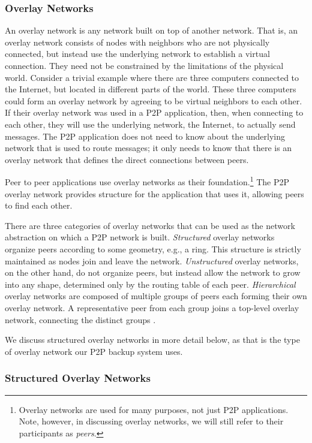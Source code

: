 \documentclass[12pt]{report}
\begin{document}
\subsubsection{Overlay Networks}

An overlay network is any network built on top of another network. That is, an overlay network consists of nodes with neighbors who are not physically connected, but instead use the underlying network to establish a virtual connection. They need not be constrained by the limitations of the physical world. Consider a trivial example where there are three computers connected to the Internet, but located in different parts of the world. These three computers could form an overlay network by agreeing to be virtual neighbors to each other. If their overlay network was used in a P2P application, then, when connecting to each other, they will use the underlying network, the Internet, to actually send messages. The P2P application does not need to know about the underlying network that is used to route messages; it only needs to know that there is an overlay network that defines the direct connections between peers.

Peer to peer applications use overlay networks as their foundation.\footnote{Overlay networks are used for many purposes, not just P2P applications. Note, however, in discussing overlay networks, we will still refer to their participants as \textit{peers}.}  The P2P overlay network provides structure for the application that uses it, allowing peers to find each other.

There are three categories of overlay networks that can be used as the network abstraction on which a P2P network is built. \textit{Structured} overlay networks organize peers according to some geometry, e.g., a ring. This structure is strictly maintained as nodes join and leave the network. \textit{Unstructured} overlay networks, on the other hand, do not organize peers, but instead allow the network to grow into any shape, determined only by the routing table of each peer. \textit{Hierarchical} overlay networks are composed of multiple groups of peers each forming their own overlay network. A representative peer from each group joins a top-level overlay network, connecting the distinct groups \cite{p2pSurvey}.

We discuss structured overlay networks in more detail below, as that is the type of overlay network our P2P backup system uses.

\subsubsection{Structured Overlay Networks} \label{subsubsec:StructuredOverlayNetworks}
\end{document}
